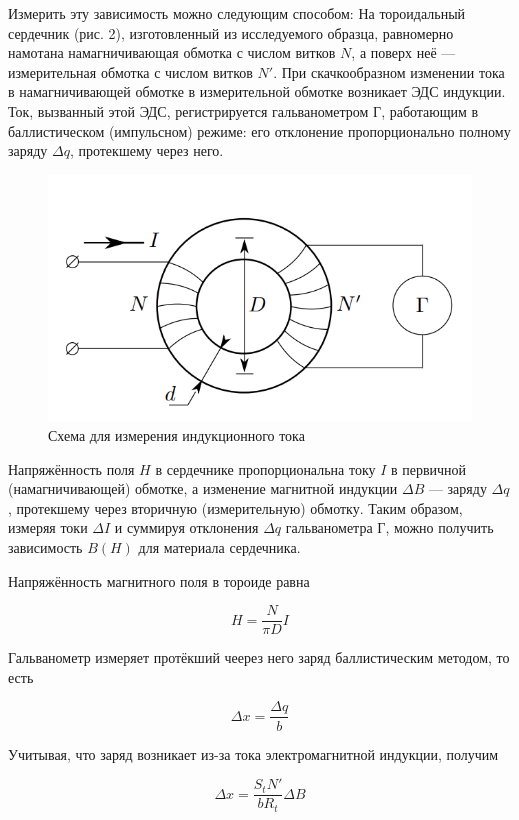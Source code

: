 Измерить эту зависимость можно следующим способом: На тороидальный сердечник (рис. 2), изготовленный из исследуемого образца, равномерно намотана намагничивающая обмотка с числом витков $N$, а поверх неё — измерительная обмотка с числом витков $N'$. При скачкообразном изменении тока в намагничивающей обмотке в измерительной
обмотке возникает ЭДС индукции. Ток, вызванный этой ЭДС, регистрируется гальванометром $\text{Г}$, работающим в баллистическом (импульсном) режиме: его отклонение пропорционально полному заряду $\Delta q$, протекшему через него.

\begin{figure}[h!]
    \centering
    \includegraphics[width = 7 cm]{images/2.png}
    \caption{Схема для измерения индукционного тока}
    \label{ris:ust1}
\end{figure}

Напряжённость поля $H$ в сердечнике пропорциональна току $I$ в первичной (намагничивающей) обмотке, а изменение магнитной индукции $\Delta B$ — заряду $\Delta q$, протекшему через вторичную (измерительную) обмотку. Таким образом, измеряя токи $\Delta I$ и суммируя отклонения $\Delta q$ гальванометра $\text{Г}$, можно получить зависимость $B(H)$ для материала сердечника.

Напряжённость магнитного поля в тороиде равна 

\begin{equation}
    \label{eq:H}
    H = \frac{N}{\pi D} I
\end{equation}

Гальванометр измеряет протёкший чеерез него заряд баллистическим методом, то есть

\begin{equation}
    \Delta x = \frac{\Delta q}{b}
\end{equation}

Учитывая, что заряд возникает из-за тока электромагнитной индукции, получим

\begin{equation}
    \Delta x = \frac{S_t N'}{b R_t} \Delta B 
\end{equation}

